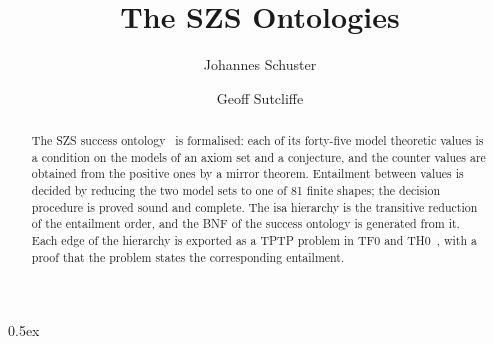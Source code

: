 \documentclass[11pt,a4paper]{article}
\begin{document}
\title{The SZS Ontologies}
\author{Johannes Schuster \and Geoff Sutcliffe}
\maketitle

\begin{abstract}
The SZS success ontology~\cite{Sut08,SZS} is formalised: each of its
forty-five model theoretic values is a condition on the models of an axiom
set and a conjecture, and the counter values are obtained from the positive
ones by a mirror theorem.  Entailment between values is decided by reducing
the two model sets to one of 81 finite shapes; the decision procedure is
proved sound and complete.  The isa hierarchy is the transitive reduction of
the entailment order, and the BNF of the success ontology is generated from
it.  Each edge of the hierarchy is exported as a TPTP problem in TF0 and
TH0~\cite{TFF0,THF0}, with a proof that the problem states the corresponding
entailment.
\end{abstract}

\setcounter{tocdepth}{2}
\tableofcontents

\parindent 0pt\parskip 0.5ex





\end{document}
